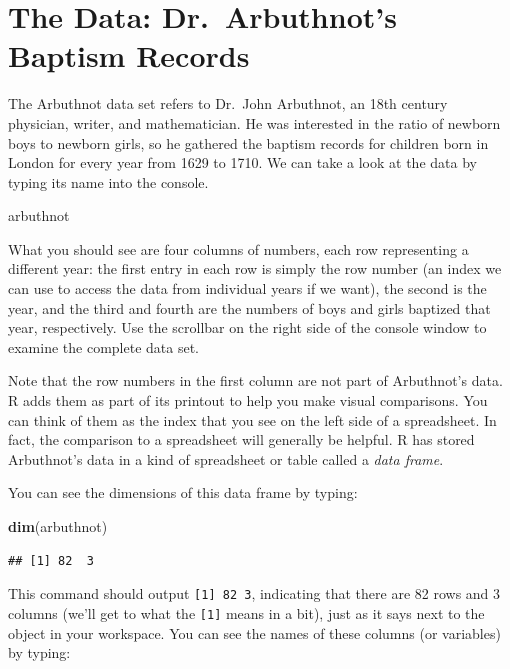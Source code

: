 \documentclass[]{book}
\newenvironment{Shaded}{\begin{snugshade}}{\end{snugshade}}
\newcommand{\KeywordTok}[1]{\textcolor[rgb]{0.13,0.29,0.53}{\textbf{{#1}}}}
\newcommand{\NormalTok}[1]{{#1}}
\theoremstyle{definition}
\theoremstyle{definition}
\theoremstyle{definition}
\theoremstyle{remark}
\begin{document}
\section{The Data: Dr.~Arbuthnot's Baptism
Records}\label{the-data-dr.arbuthnots-baptism-records}

The Arbuthnot data set refers to Dr.~John Arbuthnot, an 18th century
physician, writer, and mathematician. He was interested in the ratio of
newborn boys to newborn girls, so he gathered the baptism records for
children born in London for every year from 1629 to 1710. We can take a
look at the data by typing its name into the console.

\begin{Shaded}
\begin{Highlighting}[]
\NormalTok{arbuthnot}
\end{Highlighting}
\end{Shaded}

What you should see are four columns of numbers, each row representing a
different year: the first entry in each row is simply the row number (an
index we can use to access the data from individual years if we want),
the second is the year, and the third and fourth are the numbers of boys
and girls baptized that year, respectively. Use the scrollbar on the
right side of the console window to examine the complete data set.

Note that the row numbers in the first column are not part of
Arbuthnot's data. R adds them as part of its printout to help you make
visual comparisons. You can think of them as the index that you see on
the left side of a spreadsheet. In fact, the comparison to a spreadsheet
will generally be helpful. R has stored Arbuthnot's data in a kind of
spreadsheet or table called a \emph{data frame}.

You can see the dimensions of this data frame by typing:

\begin{Shaded}
\begin{Highlighting}[]
\KeywordTok{dim}\NormalTok{(arbuthnot)}
\end{Highlighting}
\end{Shaded}

\begin{verbatim}
## [1] 82  3
\end{verbatim}

This command should output \texttt{{[}1{]}\ 82\ 3}, indicating that
there are 82 rows and 3 columns (we'll get to what the \texttt{{[}1{]}}
means in a bit), just as it says next to the object in your workspace.
You can see the names of these columns (or variables) by typing:
\end{document}
